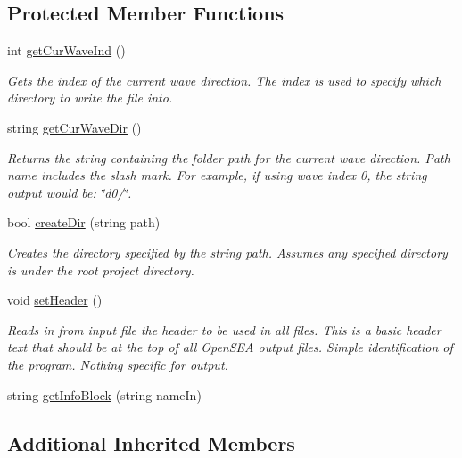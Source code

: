 \subsection*{Protected Member Functions}
\begin{DoxyCompactItemize}
\item 
int \hyperlink{class_file_writer_a9748d987475a225b49e14f48b8be0cd6}{get\-Cur\-Wave\-Ind} ()
\begin{DoxyCompactList}\small\item\em Gets the index of the current wave direction. The index is used to specify which directory to write the file into. \end{DoxyCompactList}\item 
string \hyperlink{class_file_writer_a82a3acb66bd5c0396836386258608a40}{get\-Cur\-Wave\-Dir} ()
\begin{DoxyCompactList}\small\item\em Returns the string containing the folder path for the current wave direction. Path name includes the slash mark. For example, if using wave index 0, the string output would be\-: \char`\"{}d0/\char`\"{}. \end{DoxyCompactList}\item 
bool \hyperlink{class_file_writer_ae6e5afc50484694d033628c954c62df3}{create\-Dir} (string path)
\begin{DoxyCompactList}\small\item\em Creates the directory specified by the string path. Assumes any specified directory is under the root project directory. \end{DoxyCompactList}\item 
\hypertarget{class_file_writer_aeea3ca877f0c5280b22ea7ff653db233}{void \hyperlink{class_file_writer_aeea3ca877f0c5280b22ea7ff653db233}{set\-Header} ()}\label{class_file_writer_aeea3ca877f0c5280b22ea7ff653db233}

\begin{DoxyCompactList}\small\item\em Reads in from input file the header to be used in all files. This is a basic header text that should be at the top of all Open\-S\-E\-A output files. Simple identification of the program. Nothing specific for output. \end{DoxyCompactList}\item 
string \hyperlink{class_file_writer_a419b9ba153151766c7a8c68717a11778}{get\-Info\-Block} (string name\-In)
\end{DoxyCompactItemize}
\subsection*{Additional Inherited Members}


